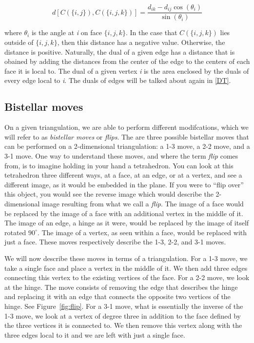 \documentclass[12pt]{article}
\begin{document}
\begin{equation}
\label{eq3}
d[C(\{i, j\}), C(\{i, j, k\})] = \frac{d_{ik} - d_{ij}\cos(\theta_i)}{\sin(\theta_i)}
\end{equation}

\noindent where $\theta_i$ is the angle at \textit{i} on face $\{i, j, k\}$. In the case that $C(\{i, j, k\})$ lies outside of $\{i, j, k\}$, then this distance has a negative value. Otherwise, the distance is positive\cite{Dave}. Naturally, the dual of a given edge has a distance that is obained by adding the distances from the center of the edge to the centers of each face it is local to. The dual of a given vertex \textit{i} is the area enclosed by the duals of every edge local to \textit{i}. The duals of edges will be talked about again in \ref{DT}.\newline

\subsection{Bistellar moves}

\noindent On a given triangulation, we are able to perform different modifcations, which we will refer to as \textit{bistellar moves} or \textit{flips}. The are three possible bistellar moves that can be performed on a 2-dimensional triangulation: a 1-3 move, a 2-2 move, and a 3-1 move. One way to understand these moves, and where the term \textit{flip} comes from, is to imagine holding in your hand a tetrahedron. You can look at this tetrahedron three different ways, at a face, at an edge, or at a vertex, and see a different image, as it would be embedded in the plane. If you were to ``flip over'' this object, you would see the reverse image which would describe the 2-dimensional image resulting from what we call a \textit{flip}. The image of a face would be replaced by the image of a face with an additional vertex in the middle of it. The image of an edge, a hinge as it were, would be replaced by the image of itself rotated $90^\circ$. The image of a vertex, as seen within a face, would be replaced with just a face. These moves respectively describe the 1-3, 2-2, and 3-1 moves.\newline

\noindent We will now describe these moves in terms of a triangulation. For a 1-3 move, we take a single face and place a vertex in the middle of it. We then add three edges connecting this vertex to the existing vertices of the face. For a 2-2 move, we look at the hinge. The move consists of removing the edge that describes the hinge and replacing it with an edge that connects the opposite two vertices of the hinge. See Figure~\ref{fig:flip}. For a 3-1 move, what is essentially the inverse of the 1-3 move, we look at a vertex of degree three in addition to the face defined by the three vertices it is connected to. We then remove this vertex along with the three edges local to it and we are left with just a single face.
\end{document}
